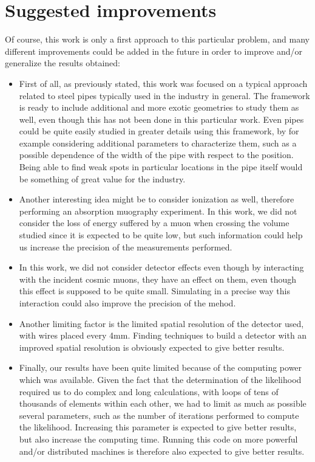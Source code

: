 \documentclass[a4paper, 11pt]{report}
\begin{document}
\section{Suggested improvements}

Of course, this work is only a first approach to this particular problem, and many different improvements could be added in the future in order to improve and/or generalize the results obtained:

\begin{itemize}
    \item First of all, as previously stated, this work was focused on a typical approach related to steel pipes typically used in the industry in general. The framework is ready to include additional and more exotic geometries to study them as well, even though this has not been done in this particular work. Even pipes could be quite easily studied in greater details using this framework, by for example considering additional parameters to characterize them, such as a possible dependence of the width of the pipe with respect to the position. Being able to find weak spots in particular locations in the pipe itself would be something of great value for the industry.
    \item Another interesting idea might be to consider ionization as well, therefore performing an absorption muography experiment. In this work, we did not consider the loss of energy suffered by a muon when crossing the volume studied since it is expected to be quite low, but such information could help us increase the precision of the measurements performed.
    \item In this work, we did not consider detector effects even though by interacting with the incident cosmic muons, they have an effect on them, even though this effect is supposed to be quite small. Simulating in a precise way this interaction could also improve the precision of the mehod.
    \item Another limiting factor is the limited spatial resolution of the detector used, with wires placed every 4mm. Finding techniques to build a detector with an improved spatial resolution is obviously expected to give better results.
    \item Finally, our results have been quite limited because of the computing power which was available. Given the fact that the determination of the likelihood required us to do complex and long calculations, with loops of tens of thousands of elements within each other, we had to limit as much as possible several parameters, such as the number of iterations performed to compute the likelihood. Increasing this parameter is expected to give better results, but also increase the computing time. Running this code on more powerful and/or distributed machines is therefore also expected to give better results.
\end{itemize}
\end{document}
